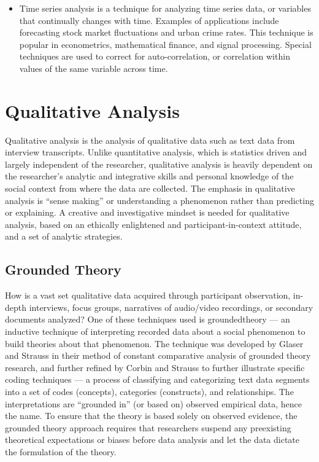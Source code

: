 \begin{itemize}
	\item Time series analysis is a technique for analyzing time series data, or variables that continually changes with time. Examples of applications include forecasting stock market fluctuations and urban crime rates. This technique is popular in econometrics, mathematical finance, and signal processing. Special techniques are used to correct for auto-correlation, or correlation within values of the same variable across time.
\end{itemize}

\section{Qualitative Analysis}

Qualitative analysis is the analysis of qualitative data such as text data from interview transcripts. Unlike quantitative analysis, which is statistics driven and largely independent of the researcher, qualitative analysis is heavily dependent on the researcher's analytic and integrative skills and personal knowledge of the social context from where the data are collected. The emphasis in qualitative analysis is ``sense making'' or understanding a phenomenon rather than predicting or explaining. A creative and investigative mindset is needed for qualitative analysis, based on an ethically enlightened and participant-in-context attitude, and a set of analytic strategies. 

\subsection{Grounded Theory}

How is a vast set qualitative data acquired through participant observation, in-depth interviews, focus groups, narratives of audio/video recordings, or secondary documents analyzed? One of these techniques used is \gls{groundedtheory} --- an inductive technique of interpreting recorded data about a social phenomenon to build theories about that phenomenon. The technique was developed by Glaser and Strauss\cite{glaser1967discovery} in their method of constant comparative analysis of grounded theory research, and further refined by Corbin and Strauss\cite{corbin1990grounded} to further illustrate specific coding techniques --- a process of classifying and categorizing text data segments into a set of codes (concepts), categories (constructs), and relationships. The interpretations are ``grounded in'' (or based on) observed empirical data, hence the name. To ensure that the theory is based solely on observed evidence, the grounded theory approach requires that researchers suspend any preexisting theoretical expectations or biases before data analysis and let the data dictate the formulation of the theory.

